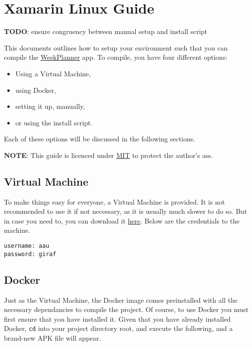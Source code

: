 \chapter{Xamarin Linux Guide} \label{app:xamarin-linux}

\textbf{TODO}: ensure congruency between manual setup and install script

This documents outlines how to setup your environment such that you can
compile the \href{https://github.com/aau-giraf/weekplanner}{WeekPlanner}
app. To compile, you have four different options:

\begin{itemize}
    \item Using a Virtual Machine,
    \item using Docker,
    \item setting it up, manually,
    \item or using the install script.
\end{itemize}

Each of these options will be discussed in the following sections.

\textbf{NOTE}: This guide is licenced under
\href{https://opensource.org/licenses/MIT}{MIT} to protect the author's
ass.

\section{Virtual Machine}

To make things easy for everyone, a Virtual Machine is provided. It is
not recommended to use it if not necessary, as it is usually much slower
to do so. But in case you need to, you can download it
\href{https://drive.google.com/file/d/1fxhboUHWcESF-H_CMSkNJFypwQi8fvjI/view?usp=sharing}{here}.
Below are the credentials to the machine.

\begin{lstlisting}
username: aau
password: giraf
\end{lstlisting}

\section{Docker}

Just as the Virtual Machine, the Docker image comes preinstalled with
all the necessary dependancies to compile the project. Of course, to use
Docker you must first ensure that you have installed it. Given that you
have already installed Docker, \lstinline{cd} into your
project directory root, and execute the following, and a brand-new APK
file will appear.

